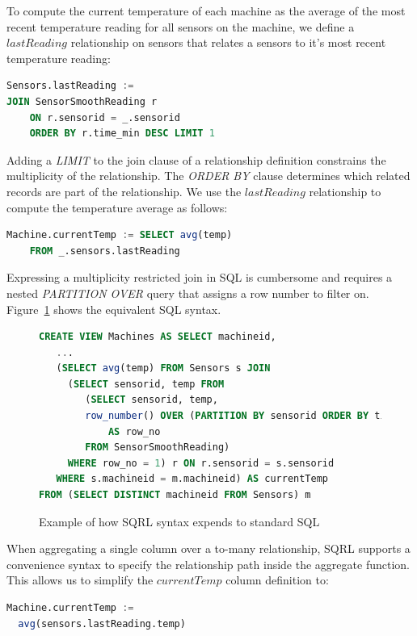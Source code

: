 \documentclass[	DIV=calc,%
							paper=letter,%
							fontsize=11pt,%
							twocolumn]{scrartcl}	 					%
\begin{document}
To compute the current temperature of each machine as the average of the most recent temperature reading for all sensors on the machine, we define a $lastReading$ relationship on sensors that relates a sensors to it's most recent temperature reading:

\begin{lstlisting}[language=SQL]
Sensors.lastReading :=
JOIN SensorSmoothReading r
    ON r.sensorid = _.sensorid
    ORDER BY r.time_min DESC LIMIT 1
\end{lstlisting}

Adding a \emph{LIMIT} to the join clause of a relationship definition constrains the multiplicity of the relationship. The \emph{ORDER BY} clause determines which related records are part of the relationship. We use the $lastReading$ relationship to compute the temperature average as follows:

\begin{lstlisting}[language=SQL]
Machine.currentTemp := SELECT avg(temp)
    FROM _.sensors.lastReading
\end{lstlisting}

Expressing a multiplicity restricted join in SQL is cumbersome and requires a nested \emph{PARTITION OVER} query that assigns a row number to filter on. Figure~\ref{fig:machinesPartitionOver} shows the equivalent SQL syntax.

\begin{figure}
\begin{lstlisting}[language=SQL]
CREATE VIEW Machines AS SELECT machineid,
   ...
   (SELECT avg(temp) FROM Sensors s JOIN
     (SELECT sensorid, temp FROM
        (SELECT sensorid, temp,
        row_number() OVER (PARTITION BY sensorid ORDER BY time_min DESC)
            AS row_no
        FROM SensorSmoothReading)
     WHERE row_no = 1) r ON r.sensorid = s.sensorid
   WHERE s.machineid = m.machineid) AS currentTemp
FROM (SELECT DISTINCT machineid FROM Sensors) m
\end{lstlisting}
\caption{Example of how SQRL syntax expends to standard SQL}
\label{fig:machinesPartitionOver}
\end{figure}

When aggregating a single column over a to-many relationship, SQRL supports a convenience syntax to specify the relationship path inside the aggregate function. This allows us to simplify the $currentTemp$ column definition to:

\begin{lstlisting}[language=SQL]
Machine.currentTemp :=
  avg(sensors.lastReading.temp)
\end{lstlisting}
\end{document}
